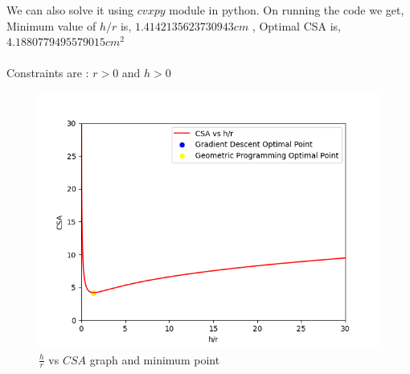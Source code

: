 \documentclass[article]{IEEEtran}
\numberwithin{figure}{enumi}
\begin{document}
We can also solve it using $cvxpy$ module in python. On running the code we get,\newline
Minimum value of $h/r$ is, $1.4142135623730943cm$
, Optimal CSA is, $ 4.1880779495579015 cm^2$ \\\\
 Constraints are : $r>0$ and $h>0$ 


\begin{figure}[h!]
   \centering
   \includegraphics[width=\columnwidth]{figures/fig.png}
   \caption{$\frac{h}{r}$ vs $CSA$ graph and minimum point}
   \label{stemplot}
\end{figure}
\end{document}
